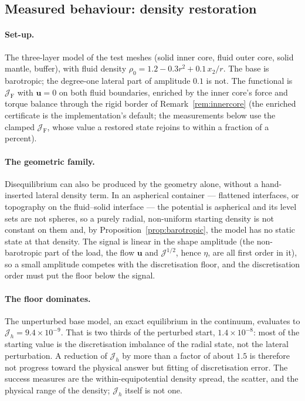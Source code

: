 \documentclass[11pt]{article}
\newcommand{\Jf}{\mathscr{J}}  %
\newcommand{\bu}{\mathbf{u}}
\newcommand{\JF}{\Jf _{\mathrm{F}}}
\begin{document}
\subsection{Measured behaviour: density restoration}
\label{sec:measured}

\paragraph{Set-up.} The three-layer model of the test meshes (solid inner
core, fluid outer core, solid mantle, buffer), with fluid density
$\rho_0 = 1.2 - 0.3r^2 + 0.1\,x_2/r$. The base is barotropic; the
degree-one lateral part of amplitude $0.1$ is not. The functional is
$\JF$ with $\bu = 0$ on both fluid boundaries, enriched by the inner
core's force and torque balance through the rigid border of
Remark~\ref{rem:innercore} (the enriched certificate is the
implementation's default; the measurements below use the clamped
$\JF$, whose value a restored state rejoins to within a fraction of a
percent).

\paragraph{The geometric family.} Disequilibrium can also be produced by
the geometry alone, without a hand-inserted lateral density term. In an
aspherical container --- flattened interfaces, or topography on the
fluid--solid interface --- the potential is aspherical and its level sets
are not spheres, so a purely radial, non-uniform starting density is not
constant on them and, by Proposition~\ref{prop:barotropic}, the model
has no static state at that density. The signal is linear in the shape
amplitude (the non-barotropic part of the load, the flow $\bu$ and
$\Jf ^{1/2}$, hence $\eta$, are all first order in it), so a small amplitude
competes with the discretisation floor, and the discretisation order must
put the floor below the signal.

\paragraph{The floor dominates.} The unperturbed base model, an exact
equilibrium in the continuum, evaluates to $\Jf _h = 9.4\times10^{-9}$. That
is two thirds of the perturbed start, $1.4\times10^{-8}$: most of the
starting value is the discretisation imbalance of the radial state, not
the lateral perturbation. A reduction of $\Jf _h$ by more than a factor of
about $1.5$ is therefore not progress toward the physical answer but
fitting of discretisation error. The success measures are the
within-equipotential density spread, the scatter, and the physical range
of the density; $\Jf _h$ itself is not one.
\end{document}
